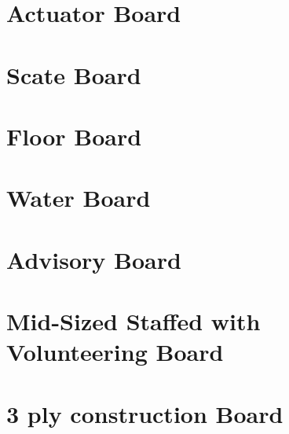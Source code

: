 \documentclass[12pt,article]{memoir}
\begin{document}
\chapter{Actuator Board}
\chapter{Scate Board}
\chapter{Floor Board}
\chapter{Water Board}
\chapter{Advisory  Board}
\chapter{Mid-Sized Staffed with Volunteering Board}
\chapter{3 ply construction Board}

\end{document}
